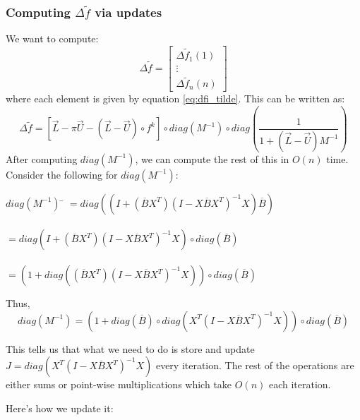 \documentclass[12pt]{article}
\newcommand{\inv}[1]{#1^{-1}}
\begin{document}
		\subsubsection{Computing $\Delta \widetilde{f}$ via updates}
			We want to compute:
			$$\Delta \widetilde{f} = \left[\begin{matrix}\Delta \widetilde{f}_1(1)\\ \vdots \\ \Delta\widetilde{f}_{n}(n)\end{matrix}\right]$$
			where each element is given by equation \ref{eq:dfi_tilde}. This can be written as:
			\begin{equation}
				\Delta \widetilde{f} = \left[\overrightarrow{L} - \pi\overrightarrow{U} - (\overrightarrow{L}-\overrightarrow{U})\circ f^k\right] \circ diag(\inv{M}) \circ diag\left(\dfrac{1}{1+(\overrightarrow{L}-\overrightarrow{U})\inv{M}}\right)
			\end{equation}
			After computing $diag(\inv{M})$, we can compute the rest of this in $O(n)$ time.
			Consider the following for $diag(\inv{M})$:
			\begin{tabbing}
				$diag(\inv{M})$ \= $=diag ((I+(\overline{B}X^T)\inv{(I-X\overline{B}X^T)}X)\overline{B})$\\\\
				\>$=diag (I+(\overline{B}X^T)\inv{(I-X\overline{B}X^T)}X)\circ diag(\overline{B})$\\\\
				\>$=(1+diag ((\overline{B}X^T)\inv{(I-X\overline{B}X^T)}X))\circ diag(\overline{B})$
			\end{tabbing}
			Thus,
			\begin{equation}
				diag(\inv{M}) =(1+diag (\overline{B}) \circ diag (X^T\inv{(I-X\overline{B}X^T)}X))\circ diag(\overline{B})
			\end{equation}

			This tells us that what we need to do is store and update \\$J = diag (X^T\inv{(I-X\overline{B}X^T)}X)$ every iteration. The rest of the operations are either sums or point-wise multiplications which take $O(n)$ each iteration.

			Here's how we update it:
\end{document}
